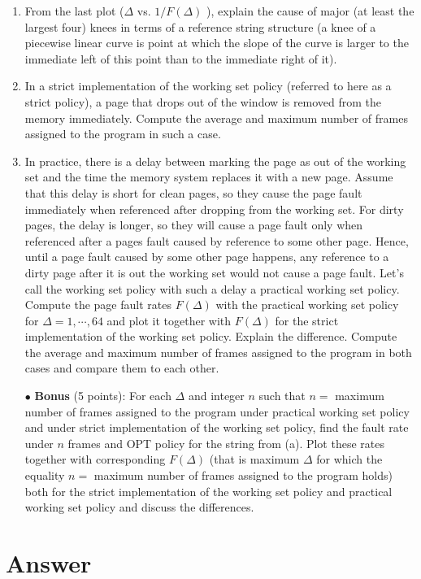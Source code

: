 \documentclass[12pt,letterpaper]{article}
\begin{document}
\begin{enumerate}
\item From the last plot ($\Delta$ vs. $1/F(\Delta)$ ), explain the cause of major (at least the
largest four) knees in terms of a reference string structure (a knee of a piecewise linear curve is
point at which the slope of the curve is larger to the immediate left of this point than to the
immediate right of it).

\item In a strict implementation of the working set policy (referred to here as a strict
policy), a page that drops out of the window is removed from the memory immediately.
Compute the average and maximum number of frames assigned to the program in such a case.

\item In practice, there is a delay between marking the page as out of the working
set and the time the memory system replaces it with a new page. Assume that this delay is
short for clean pages, so they cause the page fault immediately when referenced after dropping
from the working set. For dirty pages, the delay is longer, so they will cause a page fault only
when referenced after a pages fault caused by reference to some other page. Hence, until a
page fault caused by some other page happens, any reference to a dirty page after it is out the
working set would not cause a page fault. Let's call the working set policy with such a delay a
practical working set policy. Compute the page fault rates $F(\Delta)$ with the practical working set
policy for $\Delta = 1, \cdots, 64$ and plot it together with $F(\Delta)$ for the strict implementation of the
working set policy. Explain the difference. Compute the average and maximum number of
frames assigned to the program in both cases and compare them to each other.

\item[$\bullet$] {\bf Bonus} (5 points): For each $\Delta$ and integer $n$ such that $n =$ maximum number of
frames assigned to the program under practical working set policy and under strict
implementation of the working set policy, find the fault rate under $n$ frames and OPT policy
for the string from (a). Plot these rates together with corresponding $F(\Delta)$ (that is maximum
$\Delta$ for which the equality $n =$ maximum number of frames assigned to the program holds) both
for the strict implementation of the working set policy and practical working set policy and
discuss the differences.
\end{enumerate}

\part*{Answer}
\end{document}

